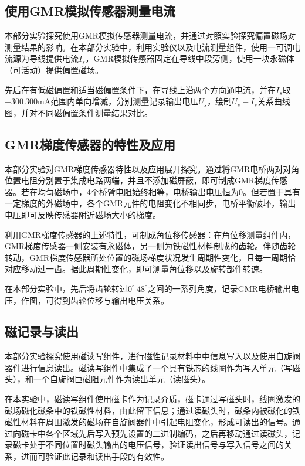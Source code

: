 \documentclass{thuemp}
\begin{document}
\subsection{使用GMR模拟传感器测量电流}

本部分实验探究使用GMR模拟传感器测量电流，并通过对照实验探究偏置磁场对测量结果的影响。在本部分实验中，利用实验仪以及电流测量组件，使用一可调电流源为导线提供电流$I_s$，GMR模拟传感器固定在导线中段旁侧，使用一块永磁体（可活动）提供偏置磁场。

先后在有低磁偏置和适当磁偏置条件下，在导线上沿两个方向通电流，并在$I_s$取$-300~300\mathrm{mA}$范围内单向增减，分别测量记录输出电压$U_s$，绘制$U_s - I_s$关系曲线图，并对不同磁偏置条件测量结果对比。

\subsection{GMR梯度传感器的特性及应用}

本部分实验对GMR梯度传感器特性以及应用展开探究。通过将GMR电桥两对对角位置电阻分别置于集成电路两端，并且不添加磁屏蔽，即可制成GMR梯度传感器。若在均匀磁场中，4个桥臂电阻始终相等，电桥输出电压恒为0。但若置于具有一定梯度的外磁场中，各个GMR元件的电阻变化不相同步，电桥平衡破坏，输出电压即可反映传感器附近磁场大小的梯度。

利用GMR梯度传感器的上述特性，可制成角位移传感器：在角位移测量组件内，GMR梯度传感器一侧安装有永磁体，另一侧为铁磁性材料制成的齿轮。伴随齿轮转动，GMR梯度传感器所处位置的磁场梯度状况发生周期性变化，且每一周期恰对应移动过一齿。据此周期性变化，即可测量角位移以及旋转部件转速。

在本部分实验中，先后将齿轮转过$0^\circ~48^\circ$之间的一系列角度，记录GMR电桥输出电压，作图，可得到齿轮位移与输出电压关系。

\subsection{磁记录与读出}

本部分实验探究使用磁读写组件，进行磁性记录材料中中信息写入以及使用自旋阀器件进行信息读出。磁读写组件中集成了一个具有铁芯的线圈作为写入单元（写磁头），和一个自旋阀巨磁阻元件作为读出单元（读磁头）。

在本实验中，磁读写组件使用磁卡作为记录介质，磁卡通过写磁头时，线圈激发的磁场磁化磁条中的铁磁性材料，由此留下信息；通过读磁头时，磁条内被磁化的铁磁性材料在周围激发的磁场在自旋阀器件中引起电阻变化，形成可读出的信号。通过向磁卡中各个区域先后写入预先设置的二进制编码，之后再移动通过读磁头，记录磁卡处于不同位置时磁头输出的电压信号，验证读出信号与写入信号之间的关系，进而可验证此记录和读出手段的有效性。
\end{document}
